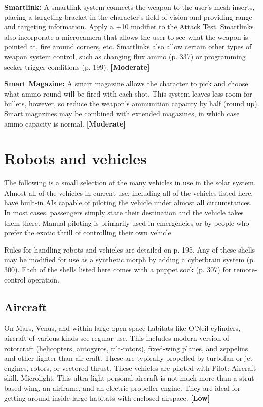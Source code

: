 \textbf{Smartlink:} A smartlink system connects the weapon to the user’s mesh inserts, placing a targeting bracket in the character’s field of vision and providing range and targeting information. Apply a +10 modifier to the Attack Test. Smartlinks also incorporate a microcamera that allows the user to see what the weapon is pointed at, fire around corners, etc. Smartlinks also allow certain other types of weapon system control, such as changing flux ammo (p. 337) or programming seeker trigger conditions (p. 199). \textbf{[Moderate]} 

\textbf{Smart Magazine:} A smart magazine allows the character to pick and choose what ammo round will be fired with each shot. This system leaves less room for bullets, however, so reduce the weapon’s ammunition capacity by half (round up). Smart magazines may be combined with extended magazines, in which case ammo capacity is normal. \textbf{[Moderate]} 

\section{Robots and vehicles} \label{sec:robots-vehicles} 

The following is a small selection of the many vehicles in use in the solar system. Almost all of the vehicles in current use, including all of the vehicles listed here, have built-in AIs capable of piloting the vehicle under almost all circumstances. In most cases, passengers simply state their destination and the vehicle takes them there. Manual piloting is primarily used in emergencies or by people who prefer the exotic thrill of controlling their own vehicle. 

Rules for handling robots and vehicles are detailed on p. 195. Any of these shells may be modified for use as a synthetic morph by adding a cyberbrain system (p. 300). Each of the shells listed here comes with a puppet sock (p. 307) for remote-control operation. 

\subsection{Aircraft} \label{sec:aircraft} 

On Mars, Venus, and within large open-space habitats like O’Neil cylinders, aircraft of various kinds see regular use. This includes modern version of rotorcraft (helicopters, autogyros, tilt-rotors), fixed-wing planes, and zeppelins and other lighter-than-air craft. These are typically propelled by turbofan or jet engines, rotors, or vectored thrust. These vehicles are piloted with Pilot: Aircraft skill. Microlight: This ultra-light personal aircraft is not much more than a strut-based wing, an airframe, and an electric propeller engine. They are ideal for getting around inside large habitats with enclosed airspace. \textbf{[Low]} 

